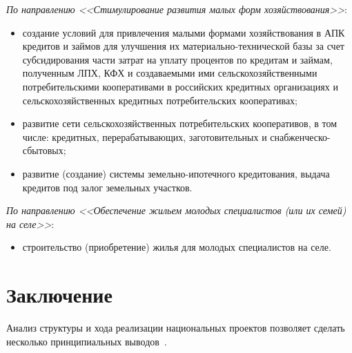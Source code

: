 \documentclass[article, 12pt, russian, oneside]{ncc}
\begin{document}
\emph{По направлению <<Стимулирование развития малых форм
  хозяйствования>>}:

\begin{itemize}
\item создание условий для привлечения малыми формами хозяйствования в
  АПК кредитов и займов для улучшения их материально-технической базы
  за счет субсидирования части затрат на уплату процентов по кредитам
  и займам, полученным ЛПХ, КФХ и создаваемыми ими
  сельскохозяйственными потребительскими кооперативами в российских
  кредитных организациях и сельскохозяйственных кредитных
  потребительских кооперативах;
\item развитие сети сельскохозяйственных потребительских кооперативов,
  в том числе: кредитных, перерабатывающих, заготовительных и
  снабженческо-сбытовых;
\item развитие (создание) системы земельно-ипотечного кредитования,
  выдача кредитов под залог земельных участков.
\end{itemize}

\emph{По направлению <<Обеспечение жильем молодых специалистов (или их
  семей) на селе>>}:

\begin{itemize}
\item строительство (приобретение) жилья для молодых специалистов на
  селе.
\end{itemize}
\newpage

\section*{Заключение}


Анализ структуры и хода реализации национальных проектов позволяет
сделать несколько принципиальных выводов~\cite{Spero}.
\end{document}
